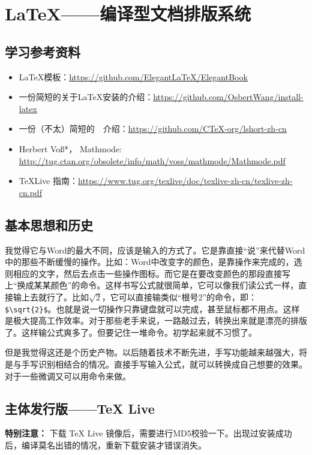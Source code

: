 \chapter{\LaTeX{}——编译型文档排版系统}
\section{学习参考资料}
\begin{itemize}
\item \LaTeX{}模板：\url{https://github.com/ElegantLaTeX/ElegantBook}
\item 一份简短的关于\LaTeX{}安装的介绍：\url{https://github.com/OsbertWang/install-latex}
\item 一份（不太）简短的~\LaTeXe{}~介绍：\url{https://github.com/CTeX-org/lshort-zh-cn}
\item Herbert Voß*，  Mathmode: \url{http://tug.ctan.org/obsolete/info/math/voss/mathmode/Mathmode.pdf}
\item \TeX Live 指南：\url{https://www.tug.org/texlive/doc/texlive-zh-cn/texlive-zh-cn.pdf}
\end{itemize}


\section{基本思想和历史}
我觉得它与Word的最大不同，应该是输入的方式了。它是靠直接“说”来代替Word中的那些不断缓慢的操作。比如：Word中改变字的颜色，是靠操作来完成的，选则相应的文字，然后去点击一些操作图标。而它是在要改变颜色的那段直接写上“换成某某颜色”的命令。这样书写公式就很简单，它可以像我们读公式一样，直接输上去就行了。比如$\sqrt{2}$，它可以直接输类似“根号2”的命令，即：\verb|$\sqrt{2}$|。也就是说一切操作只靠键盘就可以完成，甚至鼠标都不用点。这样是极大提高工作效率。对于那些老手来说，一路敲过去，转换出来就是漂亮的排版了。这样输公式爽多了。但要记住一堆命令。初学起来就不习惯了。

但是我觉得这还是个历史产物。以后随着技术不断先进，手写功能越来越强大，将是与手写识别相结合的情况。直接手写输入公式，就可以转换成自己想要的效果。对于一些微调又可以用命令来做。




\section{主体发行版——\TeX{} Live }
\textbf{特别注意：} 下载 \TeX{} Live 镜像后，需要进行MD5校验一下。出现过安装成功后，编译莫名出错的情况，重新下载安装才错误消失。


